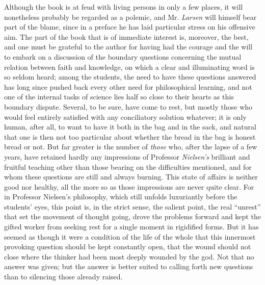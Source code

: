 \documentclass[12pt,a4paper,openany]{book}
\newcommand{\opage}[1]{\marginnote{\footnotesize\textit{[#1]}}}
\begin{document}
Although the book is at feud with living persons in only a few places, it
will nonetheless probably be regarded as a polemic, and Mr. \emph{Larsen}
will himself bear part of the blame, since in a preface he has laid
particular stress on his offensive
\opage{8}aim. The part of the book that is of immediate interest is,
moreover, the best, and one must be grateful to the author for having had
the courage and the will to embark on a discussion of the boundary
questions concerning the mutual relation between faith and knowledge, on
which a clear and illuminating word is so seldom heard; among the
students, the need to have these questions answered has long since pushed
back every other need for philosophical learning, and not one of the
internal tasks of science lies half so close to their hearts as this
boundary dispute. Several, to be sure, have come to rest, but mostly
those who would feel entirely satisfied with any conciliatory solution
whatever; it is only human, after all, to want to have it both in the bag
and in the sack, and natural that one is then not too particular about
whether the bread in the bag is honest bread or not.
But far greater is the number of \emph{those} who, after the lapse of a
few years, have retained hardly any impressions of Professor
\emph{Nielsen's} brilliant and fruitful teaching other than those bearing
on the difficulties mentioned, and for whom these questions are still and
always burning. This state of affairs is neither good nor healthy, all the
more so as those impressions are never quite clear. For in Professor
Nielsen's philosophy, which still unfolds luxuriantly before the students'
eyes, this point is, in the strict sense, the salient point, the real
``unrest'' that set the movement of thought going, drove the problems
forward and kept the gifted worker from seeking rest for a single moment
in rigidified forms.
But it has seemed as though it were a condition of the life of the whole
that this innermost provoking question should be kept constantly open,
that the wound should not close where the thinker had been most deeply
wounded by the god. Not that no answer was given; but the answer is
better suited to calling forth new questions than to silencing those
already raised.
\end{document}
